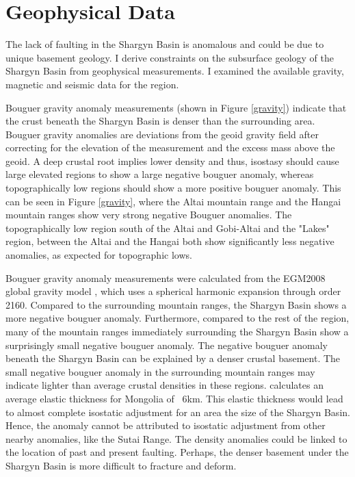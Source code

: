 \documentclass[10pt,a4paper]{article}
\begin{document}
\section{Geophysical Data}
	The lack of faulting in the Shargyn Basin is anomalous and could be due to unique basement geology. I derive constraints on the subsurface geology of the Shargyn Basin from geophysical measurements. I examined the available gravity, magnetic and seismic data for the region.

	Bouguer gravity anomaly measurements (shown in Figure \ref{gravity}) indicate that the crust beneath the Shargyn Basin is denser than the surrounding area. Bouguer gravity anomalies are deviations from the geoid gravity field after correcting for the elevation of the measurement and the excess mass above the geoid. A deep crustal root implies lower density and thus, isostasy should cause large elevated regions to show a large negative bouguer anomaly, whereas topographically low regions should show a more positive bouguer anomaly. This can be seen in Figure \ref{gravity}, where the Altai mountain range and the Hangai mountain ranges show very strong negative Bouguer anomalies. The topographically low region south of the Altai and Gobi-Altai and the "Lakes" region, between the Altai and the Hangai both show significantly less negative anomalies, as expected for topographic lows.
	
	Bouguer gravity anomaly measurements were calculated from the EGM2008 global gravity model \citep{EGM2008}, which uses a spherical harmonic expansion through order 2160. Compared to the surrounding mountain ranges, the Shargyn Basin shows a more negative bouguer anomaly. Furthermore, compared to the rest of the region, many of the mountain ranges immediately surrounding the Shargyn Basin show a surprisingly small negative bouguer anomaly. The negative bouguer anomaly beneath the Shargyn Basin can be explained by a denser crustal basement. The small negative bouguer anomaly in the surrounding mountain ranges may indicate lighter than average crustal densities in these regions. \citet{Bayasgalan2005a} calculates an average elastic thickness for Mongolia of ~6km. This elastic thickness would lead to almost complete isostatic adjustment for an area the size of the Shargyn Basin. Hence, the anomaly cannot be attributed to isostatic adjustment from other nearby anomalies, like the Sutai Range. The density anomalies could be linked to the location of past and present faulting. Perhaps, the denser basement under the Shargyn Basin is more difficult to fracture and deform.
\end{document}
